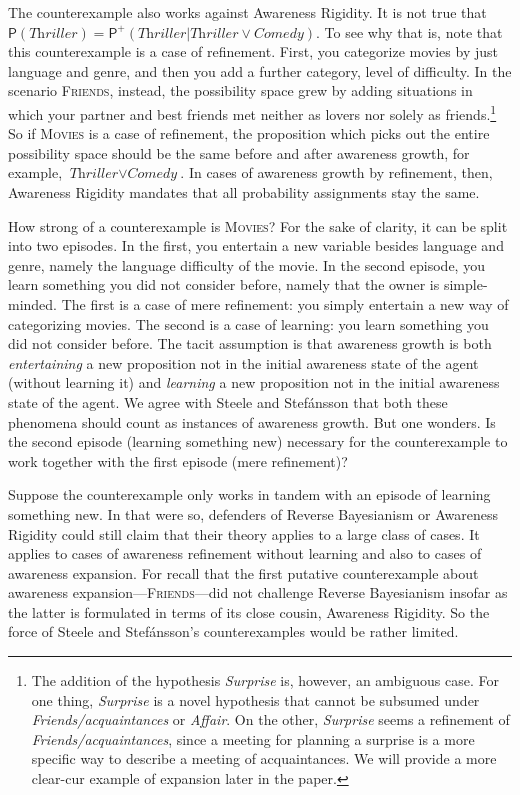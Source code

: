 \documentclass[
  11pt,
  dvipsnames,enabledeprecatedfontcommands]{scrartcl}
\newcommand{\pr}[1]{\ensuremath{\mathsf{P}(#1)}}
\newcommand{\ppr}[2]{\ensuremath{\mathsf{P}^{#1}(#2)}}
\begin{document}
The counterexample also works against Awareness Rigidity. It is not true
that
\(\pr{\textit{Thriller}}=\ppr{+}{\textit{Thriller} \vert \textit{Thriller}\vee \textit{Comedy}}\).
To see why that is, note that this counterexample is a case of
refinement. First, you categorize movies by just language and genre, and
then you add a further category, level of difficulty. In the scenario
\textsc{Friends}, instead, the possibility space grew by adding
situations in which your partner and best friends met neither as lovers
nor solely as friends.\footnote{The addition of the hypothesis
  \textit{Surprise} is, however, an ambiguous case. For one thing,
  \textit{Surprise} is a novel hypothesis that cannot be subsumed under
  \textit{Friends/acquaintances} or \textit{Affair}. On the other,
  \textit{Surprise} seems a refinement of
  \textit{Friends/acquaintances}, since a meeting for planning a
  surprise is a more specific way to describe a meeting of
  acquaintances. We will provide a more clear-cur example of expansion
  later in the paper.} So if \textsc{Movies} is a case of refinement,
the proposition which picks out the entire possibility space should be
the same before and after awareness growth, for example,
\(\textit{Thriller}\vee \textit{Comedy}\). In cases of awareness growth
by refinement, then, Awareness Rigidity mandates that all probability
assignments stay the same.

How strong of a counterexample is \textsc{Movies}? For the sake of
clarity, it can be split into two episodes. In the first, you entertain
a new variable besides language and genre, namely the language
difficulty of the movie. In the second episode, you learn something you
did not consider before, namely that the owner is simple-minded. The
first is a case of mere refinement: you simply entertain a new way of
categorizing movies. The second is a case of learning: you learn
something you did not consider before. The tacit assumption is that
awareness growth is both \textit{entertaining} a new proposition not in
the initial awareness state of the agent (without learning it) and
\textit{learning} a new proposition not in the initial awareness state
of the agent. We agree with Steele and Stefánsson that both these
phenomena should count as instances of awareness growth. But one
wonders. Is the second episode (learning something new) necessary for
the counterexample to work together with the first episode (mere
refinement)?

Suppose the counterexample only works in tandem with an episode of
learning something new. In that were so, defenders of Reverse
Bayesianism or Awareness Rigidity could still claim that their theory
applies to a large class of cases. It applies to cases of awareness
refinement without learning and also to cases of awareness expansion.
For recall that the first putative counterexample about awareness
expansion---\textsc{Friends}---did not challenge Reverse Bayesianism
insofar as the latter is formulated in terms of its close cousin,
Awareness Rigidity. So the force of Steele and Stefánsson's
counterexamples would be rather limited.
\end{document}
